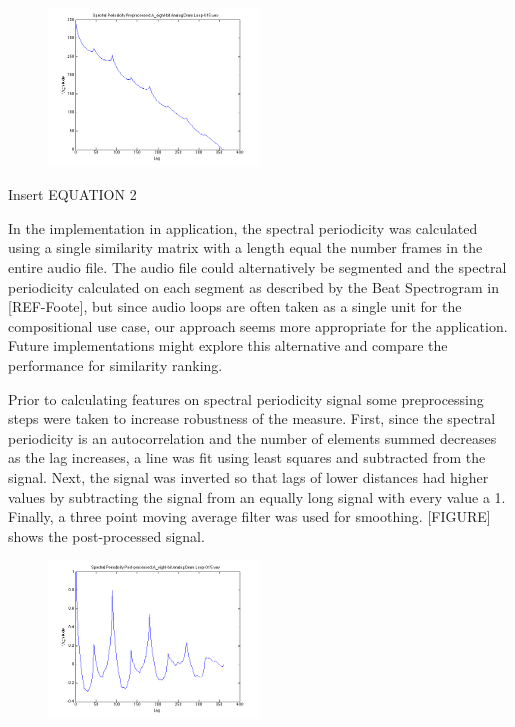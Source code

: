\documentclass{article}
\begin{document}
\begin{figure}[h!]
  \centering
    \includegraphics[width=0.5\textwidth]{bs_pre.png}
      \caption{}
\end{figure}

Insert EQUATION 2

In the implementation in application, the spectral periodicity was calculated using a single similarity matrix with a length equal the number frames in the entire audio file. The audio file could alternatively be segmented and the spectral periodicity calculated on each segment as described by the Beat Spectrogram in [REF-Foote], but since audio loops are often taken as a single unit for the compositional use case, our approach seems more appropriate for the application. Future implementations might explore this alternative and compare the performance for similarity ranking.

Prior to calculating features on spectral periodicity signal some preprocessing steps were taken to increase robustness of the measure. First, since the spectral periodicity is an autocorrelation and the number of elements summed decreases as the lag increases, a line was fit using least squares and subtracted from the signal. Next, the signal was inverted so that lags of lower distances had higher values by subtracting the signal from an equally long signal with every value a 1. Finally, a three point moving average filter was used for smoothing. [FIGURE] shows the post-processed signal.

\begin{figure}[h!]
  \centering
    \includegraphics[width=0.5\textwidth]{bs_post.png}
      \caption{}
\end{figure}
\end{document}
